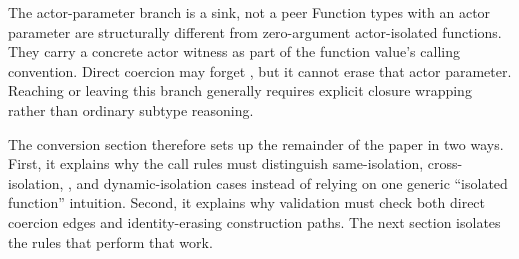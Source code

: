 \begin{propositionbox}{The actor-parameter branch is a sink, not a peer}
Function types with an  actor parameter are structurally different from zero-argument actor-isolated functions. They carry a concrete actor witness as part of the function value's calling convention. Direct coercion may forget , but it cannot erase that actor parameter. Reaching or leaving this branch generally requires explicit closure wrapping rather than ordinary subtype reasoning.
\end{propositionbox}

The conversion section therefore sets up the remainder of the paper in two ways. First, it explains why the call rules must distinguish same-isolation, cross-isolation, , and dynamic-isolation cases instead of relying on one generic ``isolated function'' intuition. Second, it explains why validation must check both direct coercion edges and identity-erasing construction paths. The next section isolates the rules that perform that work.
